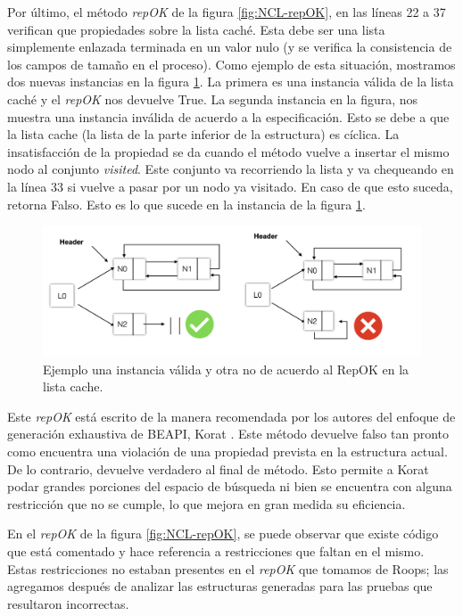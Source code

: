 Por último, el método \emph{repOK} de la figura \ref{fig:NCL-repOK}, en las líneas 22 a 37 verifican que propiedades sobre la lista caché. Esta debe ser una lista simplemente enlazada terminada en un valor nulo (y se verifica la consistencia de los campos de tamaño en el proceso). Como ejemplo de esta situación, mostramos dos nuevas instancias en la figura \ref{fig:repok3}. La primera es una instancia válida de la lista caché y el \emph{repOK} nos devuelve True. La segunda instancia en la figura, nos muestra una instancia inválida de acuerdo a la especificación. Esto se debe a que la lista cache (la lista de la parte inferior de la estructura) es cíclica. La insatisfacción  de la propiedad se da cuando el método vuelve a insertar el mismo nodo al conjunto \emph{visited}. Este conjunto va recorriendo la lista y va chequeando en la línea 33 si vuelve a pasar por un nodo ya visitado. En caso de que esto suceda, retorna Falso. Esto es lo que sucede en la instancia de la figura \ref{fig:repok3}.

\begin{figure}
  \centering
  \includegraphics[scale=0.5]{images/repok3.jpg}
  \caption{Ejemplo una instancia válida y otra no de acuerdo al RepOK en la lista cache.}
  \label{fig:repok3}
\end{figure}

Este \emph{repOK} está escrito de la manera recomendada por los autores del enfoque de generación exhaustiva de BEAPI, \textsf{Korat} \cite{Boyapati02}.
Este método devuelve falso tan pronto como encuentra una violación de una propiedad prevista en la estructura actual. De lo contrario, devuelve verdadero al final de método. Esto permite a \textsf{Korat} podar grandes porciones del espacio de búsqueda ni bien se encuentra con alguna restricción que no se cumple, lo que mejora en gran medida su eficiencia.

En el \emph{repOK} de la figura \ref{fig:NCL-repOK}, se puede observar que existe código que está comentado y hace referencia a restricciones que faltan en el mismo. Estas restricciones no estaban presentes en el \emph{repOK} que tomamos de Roops; las agregamos después de analizar las estructuras generadas para las pruebas que resultaron incorrectas.

